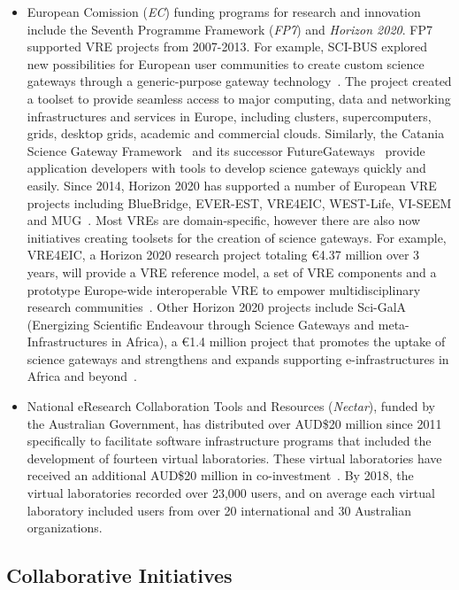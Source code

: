 \documentclass[review]{elsarticle}
\begin{document}
\begin{itemize}
\item European Comission (\emph{EC}) funding programs for research and innovation include the Seventh Programme Framework (\emph{FP7}) and \emph{Horizon 2020}. FP7 supported VRE projects from 2007-2013.
For example, SCI-BUS explored new possibilities for European user communities to create custom science gateways through a generic-purpose gateway technology~\cite{kacsuk2014-18}. 
The project created a toolset to provide seamless access to major computing, data and networking infrastructures and services in Europe, including clusters, supercomputers, grids, desktop grids, academic and commercial clouds. Similarly, the Catania Science Gateway Framework~\cite{decide-19} and its successor FutureGateways~\cite{futuregateway} provide application developers with tools to develop science gateways quickly and easily. 
Since 2014, Horizon 2020 has supported a number of European VRE projects including BlueBridge, EVER-EST, VRE4EIC, WEST-Life, VI-SEEM and MUG~\cite{h2020-projects-20}. 
Most VREs are domain-specific, however there are also now initiatives creating toolsets for the creation of science gateways. 
For example, VRE4EIC, a Horizon 2020 research project totaling \euro 4.37 million over 3 years, will provide a VRE reference model, a set of VRE components and a prototype Europe-wide interoperable VRE to empower multidisciplinary research communities~\cite{vre4eic-21}. 
Other Horizon 2020 projects include Sci-GalA (Energizing Scientific Endeavour through Science Gateways and meta-Infrastructures in Africa), a \euro 1.4 million project that promotes the uptake of science gateways and strengthens and expands supporting e-infrastructures in Africa and beyond~\cite{sci-gaia-22}.

\item National eResearch Collaboration Tools and Resources (\emph{Nectar}), funded by the Australian Government, has distributed over AUD\$20 million since 2011 specifically to facilitate software infrastructure programs that included the development of fourteen virtual laboratories. These virtual laboratories have received an additional AUD\$20 million in co-investment~\cite{nectar-impact-3}. By 2018, the virtual laboratories recorded over 23,000 users, and on average each virtual laboratory included users from over 20 international and 30 Australian organizations.

\end{itemize}

\subsection{Collaborative Initiatives}
\end{document}
